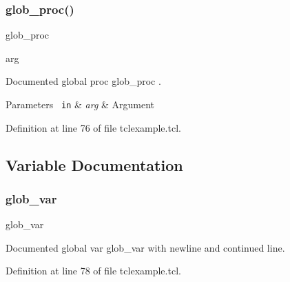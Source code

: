 \subsubsection{\texorpdfstring{glob\_proc()}{glob\_proc()}}
{\footnotesize\ttfamily glob\+\_\+proc\begin{DoxyParamCaption}\item[{}]{arg  }\end{DoxyParamCaption}}



Documented global proc {\ttfamily glob\+\_\+proc} . 


\begin{DoxyParams}[1]{Parameters}
\mbox{\texttt{ in}}  & {\em arg} & Argument \\
\hline
\end{DoxyParams}


Definition at line 76 of file tclexample.\+tcl.


\begin{DoxyCode}{0}

\end{DoxyCode}


\subsection{Variable Documentation}
\mbox{\label{tclexample_8tcl_ad2fbf59c85e6c46b8cc2dad76eac512f}} 
\subsubsection{\texorpdfstring{glob\_var}{glob\_var}}
{\footnotesize\ttfamily glob\+\_\+var\hspace{0.3cm}{\ttfamily [static]}}



Documented global var {\ttfamily glob\+\_\+var} with newline and continued line. 



Definition at line 78 of file tclexample.\+tcl.


\begin{DoxyCode}{0}

\end{DoxyCode}
